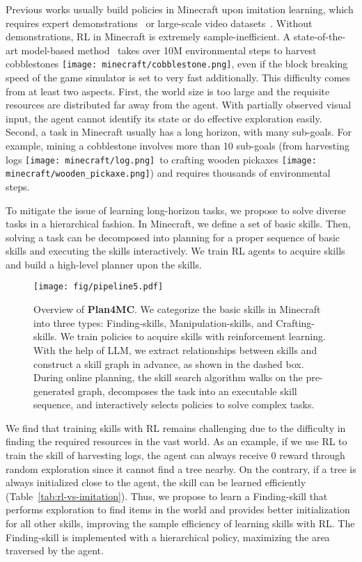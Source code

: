 \documentclass{article}
\newcommand{\mccobblestone}{\texttt{[image: minecraft/cobblestone.png]}}
\newcommand{\mclog}{\texttt{[image: minecraft/log.png]}}
\newcommand{\mcwoodenpickaxe}{\texttt{[image: minecraft/wooden\_pickaxe.png]}}
\begin{document}
Previous works usually build policies in Minecraft upon imitation learning, which requires expert demonstrations~\citep{minerl, goal-aware-learning, deps} or large-scale video datasets~\citep{vpt}.
Without demonstrations, RL in Minecraft is extremely sample-inefficient. A state-of-the-art model-based method~\citep{dreamer-v3} takes over 10M environmental steps to harvest cobblestones \mccobblestone, even if the block breaking speed of the game simulator is set to very fast additionally. 
This difficulty comes from at least two aspects. First, the world size is too large and the requisite resources are distributed far away from the agent. 
With partially observed visual input, the agent cannot identify its state or do effective exploration easily. Second, a task in Minecraft usually has a long horizon, with many sub-goals. For example, mining a cobblestone involves more than 10 sub-goals (from harvesting logs \mclog \ to crafting wooden pickaxes \mcwoodenpickaxe) and requires thousands of environmental steps. 

To mitigate the issue of learning long-horizon tasks, we propose to solve diverse tasks in a hierarchical fashion. In Minecraft, we define a set of basic skills. Then, solving a task can be decomposed into planning for a proper sequence of basic skills and executing the skills interactively. We train RL agents to acquire skills and build a high-level planner upon the skills.

\begin{figure}[!t]
  \centering
  \texttt{[image: fig/pipeline5.pdf]}
  \caption{Overview of \textbf{Plan4MC}. We categorize the basic skills in Minecraft into three types: Finding-skills, Manipulation-skills, and Crafting-skills. We train policies to acquire skills with reinforcement learning. With the help of LLM, we extract relationships between skills and construct a skill graph in advance, as shown in the dashed box. During online planning, the skill search algorithm walks on the pre-generated graph, decomposes the task into an executable skill sequence, and interactively selects policies to solve complex tasks.}
  \label{fig:pipeline}
\end{figure}

We find that training skills with RL remains challenging due to the difficulty in finding the required resources in the vast world. As an example, if we use RL to train the skill of harvesting logs, the agent can always receive 0 reward through random exploration since it cannot find a tree nearby. On the contrary, if a tree is always initialized close to the agent, the skill can be learned efficiently (Table~\ref{tab:rl-vs-imitation}). Thus, we propose to learn a Finding-skill that performs exploration to find items in the world and provides better initialization for all other skills, improving the sample efficiency of learning skills with RL. The Finding-skill is implemented with a hierarchical policy, maximizing the area traversed by the agent.
\end{document}
